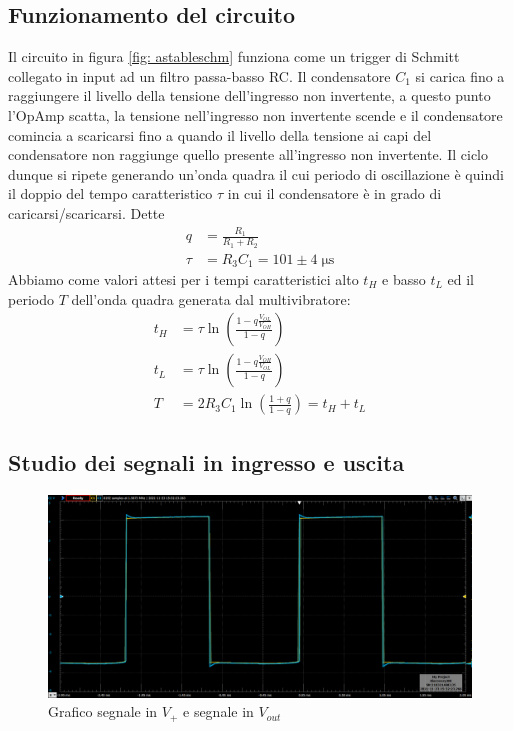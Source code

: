 \documentclass[10pt,a4paper]{article}
\begin{document}
\subsection{Funzionamento del circuito}
Il circuito in figura \ref{fig: astableschm} funziona come un trigger di
Schmitt collegato in input ad un filtro passa-basso RC. Il condensatore $C_1$ si
carica fino a raggiungere il livello della tensione dell’ingresso non
invertente, a questo punto l’OpAmp scatta, la tensione nell’ingresso non invertente
scende e il condensatore comincia a scaricarsi fino a quando il livello della
tensione ai capi del condensatore non raggiunge quello presente all’ingresso
non invertente.
Il ciclo dunque si ripete generando un'onda quadra il cui periodo di
oscillazione è quindi il doppio del tempo caratteristico $\tau$ in
cui il condensatore è in grado di caricarsi/scaricarsi.
Dette
\begin{align*}
q &= \frac{R_1}{R_1 + R_2} \\
\tau &= R_3 C_1 = 101 \pm 4 \; \si{\micro\s}
\end{align*}
Abbiamo come valori attesi per i tempi caratteristici alto $t_H$ e basso
$t_L$ ed il periodo $T$ dell'onda quadra generata dal multivibratore:
\begin{align}
t_H &= \tau \ln\left(\frac{1 - q\frac{V_{OL}}{V_{OH}}}{1-q}\right) \\
t_L &= \tau \ln\left(\frac{1 - q\frac{V_{OH}}{V_{OL}}}{1-q}\right) \\
T &= 2 R_3 C_1 \ln\left(\frac{1 + q}{1 - q}\right) = t_H + t_L
\end{align}

\setcounter{subsection}{2}
\subsection{Studio dei segnali in ingresso e uscita}

\begin{figure}[htbp]
\centering
\includegraphics[scale=0.4]{V+Vout}
\caption{Grafico segnale in $V_+$ e segnale in $V_{out}$}
\end{figure}
\end{document}
